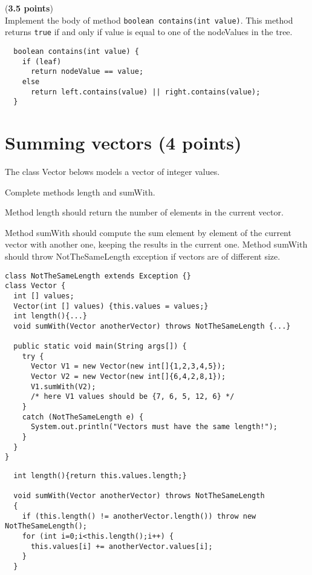 \documentclass[correction]{exercices}
\begin{document}
\begin{question} (\textbf{3.5 points}) \\
Implement the body of method \lstinline!boolean contains(int value)!.
This method returns \lstinline!true! if and only if value is equal to one
of the nodeValues in the tree.

\begin{correction}
\begin{verbatim}
  boolean contains(int value) {
    if (leaf)
      return nodeValue == value;
    else
      return left.contains(value) || right.contains(value);
  }
\end{verbatim}
\end{correction}
\end{question}

\section{Summing vectors (4 points)}

The class Vector belows models a vector of integer values.

Complete methods length and sumWith.

Method length should return the number of elements in the current vector.

Method sumWith should compute the sum element by element of the current
vector with another one, keeping the results in the current one.
Method sumWith should throw NotTheSameLength exception if vectors are of
different size.

\begin{verbatim}
class NotTheSameLength extends Exception {}
class Vector {
  int [] values;
  Vector(int [] values) {this.values = values;}
  int length(){...}
  void sumWith(Vector anotherVector) throws NotTheSameLength {...}

  public static void main(String args[]) {
    try {
      Vector V1 = new Vector(new int[]{1,2,3,4,5});
      Vector V2 = new Vector(new int[]{6,4,2,8,1});
      V1.sumWith(V2);
      /* here V1 values should be {7, 6, 5, 12, 6} */
    }
    catch (NotTheSameLength e) {
      System.out.println("Vectors must have the same length!");
    }
  }
}
\end{verbatim}


\begin{correction}
\begin{verbatim}
  int length(){return this.values.length;}

  void sumWith(Vector anotherVector) throws NotTheSameLength
  {
    if (this.length() != anotherVector.length()) throw new NotTheSameLength();
    for (int i=0;i<this.length();i++) {
      this.values[i] += anotherVector.values[i];
    }
  }
\end{verbatim}
\end{correction}
\end{document}
